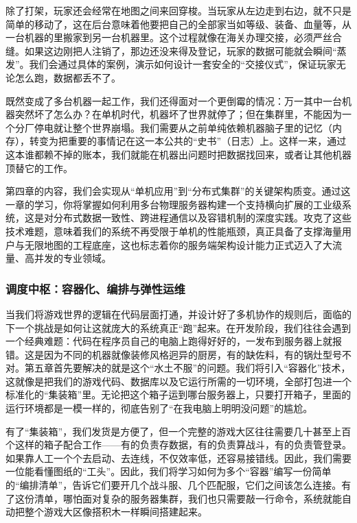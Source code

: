 除了打架，玩家还会经常在地图之间来回穿梭。当玩家从左边走到右边，就不只是简单的移动了，这在后台意味着他要把自己的全部家当如等级、装备、血量等，从一台机器的里搬家到另一台机器里。这个过程就像在海关办理交接，必须严丝合缝。如果这边刚把人注销了，那边还没来得及登记，玩家的数据可能就会瞬间“蒸发”。我们会通过具体的案例，演示如何设计一套安全的“交接仪式”，保证玩家无论怎么跑，数据都丢不了。

既然变成了多台机器一起工作，我们还得面对一个更倒霉的情况：万一其中一台机器突然坏了怎么办？在单机时代，机器坏了世界就停了；但在集群里，不能因为一个分厂停电就让整个世界崩塌。我们需要从之前单纯依赖机器脑子里的记忆（内存），转变为把重要的事情记在这一本公共的“史书”（日志）上。这样一来，通过这本谁都赖不掉的账本，我们就能在机器出问题时把数据找回来，或者让其他机器顶替它的工作。

第四章的内容，我们会实现从“单机应用”到“分布式集群”的关键架构质变。通过这一章的学习，你将掌握如何利用多台物理服务器构建一个支持横向扩展的工业级系统，这是对分布式数据一致性、跨进程通信以及容错机制的深度实践。攻克了这些技术难题，意味着我们的系统不再受限于单机的性能瓶颈，真正具备了支撑海量用户与无限地图的工程底座，这也标志着你的服务端架构设计能力正式迈入了大流量、高并发的专业领域。


\subsubsection{调度中枢：容器化、编排与弹性运维}\label{sec:调度中枢}
当我们将游戏世界的逻辑在代码层面打通，并设计好了多机协作的规则后，面临的下一个挑战是如何让这就庞大的系统真正“跑”起来。在开发阶段，我们往往会遇到一个经典难题：代码在程序员自己的电脑上跑得好好的，一发布到服务器上就报错。这是因为不同的机器就像装修风格迥异的厨房，有的缺佐料，有的锅灶型号不对。第五章首先要解决的就是这个“水土不服”的问题。我们将引入“容器化”技术，这就像是把我们的游戏代码、数据库以及它运行所需的一切环境，全部打包进一个标准化的“集装箱”里。无论把这个箱子运到哪台服务器上，只要打开箱子，里面的运行环境都是一模一样的，彻底告别了“在我电脑上明明没问题”的尴尬。

有了“集装箱”，我们发货是方便了，但一个完整的游戏大区往往需要几十甚至上百个这样的箱子配合工作——有的负责存数据，有的负责算战斗，有的负责管登录。如果靠人工一个个去启动、去连线，不仅效率低，还容易接错线。因此，我们需要一位能看懂图纸的“工头”。因此，我们将学习如何为多个“容器”编写一份简单的“编排清单”，告诉它们要开几个战斗服、几个匹配服，它们之间该怎么连接。有了这份清单，哪怕面对复杂的服务器集群，我们也只需要敲一行命令，系统就能自动把整个游戏大区像搭积木一样瞬间搭建起来。

